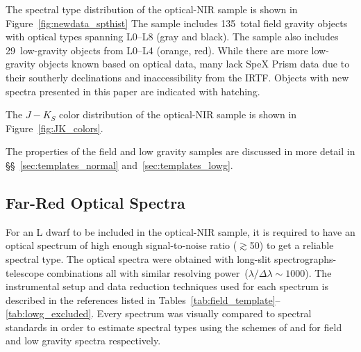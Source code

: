 \documentclass[12pt,preprint]{aastex}
\newcommand{\optNormal}{135}
\newcommand{\optLowG}{29}
\begin{document}
The spectral type distribution of the optical-NIR sample is shown in Figure~\ref{fig:newdata_spthist} 
The sample includes \optNormal~total field gravity objects with optical types spanning L0--L8 (gray and black).
The sample also includes \optLowG~low-gravity objects from L0--L4 (orange, red). 
While there are more low-gravity objects known based on optical data, many lack SpeX Prism data due to their southerly declinations and inaccessibility from the IRTF.
Objects with new spectra presented in this paper are indicated with hatching.

The $J-K_S$ color distribution of the optical-NIR sample is shown in Figure~\ref{fig:JK_colors}.

The properties of the field and low gravity samples are discussed in more detail in \S\S~\ref{sec:templates_normal} and~\ref{sec:templates_lowg}.

\subsection{Far-Red Optical Spectra}

For an L dwarf to be included in the optical-NIR sample, it is required to have an optical spectrum of high enough signal-to-noise ratio ($\gtrsim$50) to get a reliable spectral type.
The optical spectra were obtained with long-slit spectrographs-telescope combinations all with similar resolving power~($\lambda/\Delta\lambda\sim1000$). 
The instrumental setup and data reduction techniques used for each spectrum is described in the references listed in Tables~\ref{tab:field_template}--\ref{tab:lowg_excluded}.
Every spectrum was visually compared to spectral standards in order to estimate spectral types using the schemes of \citet{K99} and \cite{Cruz09_lowg} for field and low gravity spectra respectively.  


\end{document}
